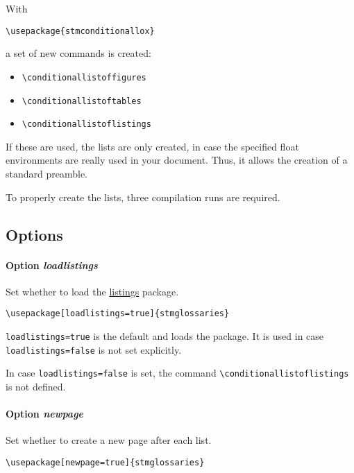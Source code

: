 \documentclass[listof=totoc]{scrartcl}
\begin{document}
With

\begin{verbatim}
\usepackage{stmconditionallox}
\end{verbatim}

a set of new commands is created:

\begin{itemize}
  \item \verb+\conditionallistoffigures+
  \item \verb+\conditionallistoftables+
  \item \verb+\conditionallistoflistings+
\end{itemize}

If these are used, the lists are only created, in case the specified float environments are really used in your document. Thus, it allows the creation of a standard preamble.

To properly create the lists, three compilation runs are required.

\subsection{Options}

\paragraph{Option \protect\textit{loadlistings}}

Set whether to load the \href{https://ctan.org/pkg/listings}{listings} package.

\begin{verbatim}
\usepackage[loadlistings=true]{stmglossaries}
\end{verbatim}

\texttt{loadlistings=true} is the default and loads the package. It is used in case \texttt{loadlistings=false} is not set explicitly.

In case \texttt{loadlistings=false} is set, the command \verb+\conditionallistoflistings+ is not defined.

\paragraph{Option \protect\textit{newpage}}

Set whether to create a new page after each list.

\begin{verbatim}
\usepackage[newpage=true]{stmglossaries}
\end{verbatim}
\end{document}
